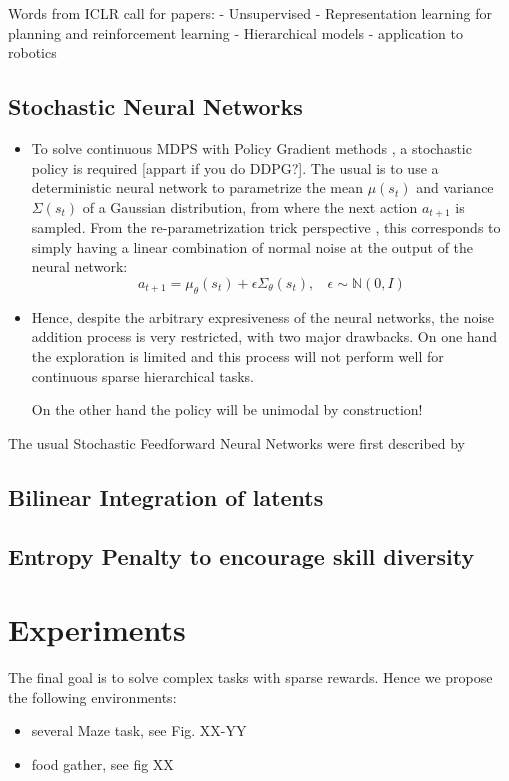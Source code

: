 \documentclass{article} %
\begin{document}
Words from ICLR call for papers:
- Unsupervised
- Representation learning for planning and reinforcement learning
- Hierarchical models
- application to robotics

\subsection{Stochastic Neural Networks}

\begin{itemize}
    \item To solve continuous MDPS with Policy Gradient methods \citep{peters2008reinforcement}, a stochastic policy is required [appart if you do DDPG?]. The usual is to use a deterministic neural network to parametrize the mean $\mu(s_t)$ and variance $\Sigma(s_t)$ of a Gaussian distribution, from where the next action $a_{t+1}$ is sampled. From the re-parametrization trick perspective \citep{look at SVG paper or DeepMind-modulate}, this corresponds to simply having a linear combination of normal noise at the output of the neural network:
    \begin{equation}
        a_{t+1} = \mu_{\theta}(s_t) +\epsilon \Sigma_\theta(s_t), ~~~~ \epsilon \sim \mathbb{N}(0,I)
    \end{equation}
    \item Hence, despite the arbitrary expresiveness of the neural networks, the noise addition process is very restricted, with two major drawbacks. On one hand the exploration is limited and this process will not perform well for continuous sparse hierarchical tasks. 
    
    On the other hand the policy will be unimodal by construction!
\end{itemize}
The usual Stochastic Feedforward Neural Networks were first described by \citet{tang2013sfnn}

\subsection{Bilinear Integration of latents}

\subsection{Entropy Penalty to encourage skill diversity}

\section{Experiments}
The final goal is to solve complex tasks with sparse rewards. Hence we propose the following environments:
\begin{itemize}
    \item several Maze task, see Fig. XX-YY
    \item food gather, see fig XX
\end{itemize}
\end{document}
